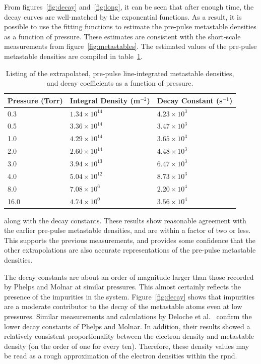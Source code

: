 From figures~\ref{fig:decay} and~\ref{fig:long}, it can be seen that after
enough time, the decay curves are well-matched by the exponential functions. As
a result, it is possible to use the fitting functions to estimate the pre-pulse
metastable densities as a function of pressure. These estimates are consistent
with the short-scale measurements from figure~\ref{fig:metastables}. The
estimated values of the pre-pulse metastable densities are compiled in
table~\ref{tbl:prepulse}.
\begin{table}
  \centering
  \caption{Listing of the extrapolated, pre-pulse line-integrated metastable 
  densities, and decay coefficients as a function of pressure.}
  \begin{tabular}{lll}
    \toprule
    Pressure (Torr) & Integral Density (m$^{-2}$) & Decay Constant (s$^{-1}$) \\
    \midrule
    0.3  & $1.34\times10^{14}$ & $4.23\times10^3$ \\
    0.5  & $3.36\times10^{14}$ & $3.47\times10^3$ \\
    1.0  & $4.29\times10^{14}$ & $3.65\times10^3$ \\
    2.0  & $2.60\times10^{14}$ & $4.48\times10^3$ \\
    3.0  & $3.94\times10^{13}$ & $6.47\times10^3$ \\
    4.0  & $5.04\times10^{12}$ & $8.73\times10^3$ \\
    8.0  & $7.08\times10^{6}$  & $2.20\times10^4$ \\
    16.0 & $4.74\times10^{0}$  & $3.56\times10^4$ \\
    \bottomrule
  \end{tabular}
  \label{tbl:prepulse}
\end{table}
along with the decay constants. These results show reasonable agreement with the
earlier pre-pulse metastable densities, and are within a factor of two or less.
This supports the previous measurements, and provides some confidence that the
other extrapolations are also accurate representations of the pre-pulse
metastable densities.

The decay constants are about an order of magnitude larger than those recorded
by Phelps and Molnar \cite{Phelps1953} at similar pressures. This almost
certainly reflects the presence of the impurities in the system.
Figure~\ref{fig:decay} shows that impurities are a moderate contributor to the
decay of the metastable atoms even at low pressures. Similar measurements and
calculations by Deloche et al.~\cite{Deloche1976} confirm the lower decay
constants of Phelps and Molnar. In addition, their results showed a relatively
consistent proportionality between the electron density and metastable density
(on the order of one for every ten). Therefore, these density values may be read
as a rough approximation of the electron densities within the \acs{rpnd}.

